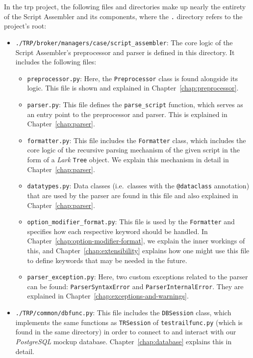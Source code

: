 In the \gls{trp} project, the following files and directories make up nearly the entirety of the Script Assembler and its components, where the \verb|.| directory refers to the project's root:
\begin{itemize}
    \item \verb|./TRP/broker/managers/case/script_assembler|: The core logic of the Script Assembler's preprocessor and parser is defined in this directory. It includes the following files:
    \begin{itemize}
        \item \verb|preprocessor.py|: Here, the \verb|Preprocessor| class is found alongside its logic. This file is shown and explained in Chapter~\ref{chap:preprocessor}.
        \item \verb|parser.py|: This file defines the \verb|parse_script| function, which serves as an entry point to the preprocessor and parser. This is explained in Chapter~\ref{chap:parser}. 
        \item \verb|formatter.py|: This file includes the \verb|Formatter| class, which includes the core logic of the recursive parsing mechanism of the given script in the form of a \textit{Lark} \verb|Tree| object. We explain this mechanism in detail in Chapter~\ref{chap:parser}.
        \item \verb|datatypes.py|: Data classes (i.e.\ classes with the \verb|@dataclass| annotation) that are used by the parser are found in this file and also explained in Chapter~\ref{chap:parser}.
        \item \verb|option_modifier_format.py|: This file is used by the \verb|Formatter| and specifies how each respective keyword should be handled. In Chapter~\ref{chap:option-modifier-format}, we explain the inner workings of this, and Chapter~\ref{chap:extensibility} explains how one might use this file to define keywords that may be needed in the future.
        \item \verb|parser_exception.py|: Here, two custom exceptions related to the parser can be found: \verb|ParserSyntaxError| and \verb|ParserInternalError|. They are explained in Chapter~\ref{chap:exceptions-and-warnings}.
    \end{itemize}
    \item \verb|./TRP/common/dbfunc.py|: This file includes the \verb|DBSession| class, which implements the same functions as \verb|TRSession| of \verb|testrailfunc.py| (which is found in the same directory) in order to connect to and interact with our \textit{PostgreSQL} mockup database. Chapter~\ref{chap:database} explains this in detail.

\end{itemize}
